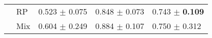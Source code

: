 \begin{tabular}[t]{lllll}
 & RP & \textcolor[rgb]{0.9027777778,0.0972222222,0}{0.523} $\pm$ \textcolor[rgb]{0.2527202683,0.5000000000,0}{0.075} & \textcolor[rgb]{0.4005979073,0.5000000000,0}{0.848} $\pm$ \textcolor[rgb]{0.0540306485,0.5000000000,0}{0.073} & \textcolor[rgb]{0.5132743363,0.4867256637,0}{0.743} $\pm$ \textbf{\textcolor[rgb]{0.0000000000,0.5000000000,0}{0.109}} \\
 & Mix & \textcolor[rgb]{0.7161458333,0.2838541667,0}{0.604} $\pm$ \textcolor[rgb]{0.8349973530,0.1650026470,0}{0.249} & \textcolor[rgb]{0.2680617838,0.5000000000,0}{0.884} $\pm$ \textcolor[rgb]{0.2488331266,0.5000000000,0}{0.107} & \textcolor[rgb]{0.4955752212,0.5000000000,0}{0.750} $\pm$ \textcolor[rgb]{0.6255914256,0.3744085744,0}{0.312} \\
\bottomrule
\end{tabular}

